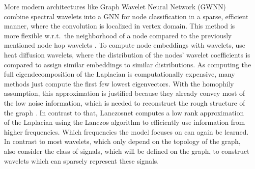 \documentclass{article}
\begin{document}
More modern architectures like Graph Wavelet Neural Network (GWNN) \cite{ xu2019graph} combine spectral wavelets into a GNN for node classification in a sparse, efficient manner, where the convolution is localized in vertex domain. This method is more flexible w.r.t.\ the neighborhood of a node compared to the previously mentioned node hop wavelets \cite{crovella2003graph}.
To compute node embeddings with wavelets, \citet{donnat2018learning} use heat diffusion wavelets, where the distribution of the nodes' wavelet coefficients is compared to assign similar embeddings to similar distributions.
 As computing the full eigendecomposition of the Laplacian is computationally expensive, many methods just compute the first few lowest eigenvectors. %
 With the homophily assumption, this approximation is justified because they already convey most of the low noise information, which is needed to reconstruct the rough structure of the graph%
. In contrast to that, Lanczosnet \cite{liao2019lanczosnet} computes a low rank approximation of the Laplacian %
using the Lanczos algorithm to efficiently use information from higher frequencies. Which frequencies the model focuses on can again be learned. %
 In contrast to most wavelets, which only depend on the topology of the graph, \citet{rustamov2013wavelets} also consider the class of signals, which will be defined on the graph, to construct wavelets which can sparsely represent these signals.
\end{document}
